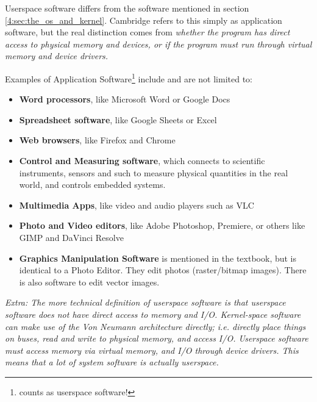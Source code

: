 \documentclass[../main.tex]{subfiles}
\begin{document}
Userspace software differs from the software mentioned in section \ref{4:sec:the_os_and_kernel}. Cambridge refers to this simply as application software, but the real distinction comes from \emph{whether the program has direct access to physical memory and devices, or if the program must run through virtual memory and device drivers.}

Examples of Application Software\footnote{counts as userspace software!} include and are not limited to:

\begin{itemize}
    \item \textbf{Word processors}, like Microsoft Word or Google Docs
    \item \textbf{Spreadsheet software}, like Google Sheets or Excel
    \item \textbf{Web browsers}, like Firefox and Chrome
    \item \textbf{Control and Measuring software}, which connects to scientific instruments, sensors and such to measure physical quantities in the real world, and controls embedded systems.
    \item \textbf{Multimedia Apps}, like video and audio players such as VLC
    \item \textbf{Photo and Video editors}, like Adobe Photoshop, Premiere, or others like GIMP and DaVinci Resolve
    \item \textbf{Graphics Manipulation Software} is mentioned in the textbook, but is identical to a Photo Editor. They edit photos (raster/bitmap images). There is also software to edit vector images.
\end{itemize}

\textit{Extra: The more technical definition of userspace software is that userspace software does not have direct access to memory and I/O. Kernel-space software can make use of the Von Neumann architecture directly; i.e. directly place things on buses, read and write to physical memory, and access I/O. Userspace software must access memory via virtual memory, and I/O through device drivers. This means that a lot of system software is actually userspace.}
\end{document}
